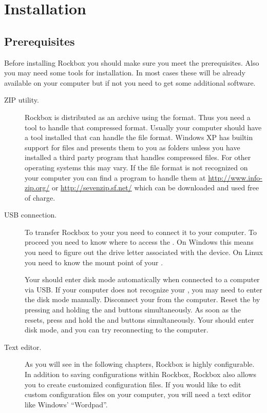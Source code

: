 \chapter{Installation}\label{sec:installation}

\section{Prerequisites}\label{sec:prerequisites}

Before installing Rockbox you should make sure you meet the prerequisites.
Also you may need some tools for installation. In most cases these will be
already available on your computer but if not you need to get some additional
software.

	\begin{description}
		
		\item[ZIP utility.]	  Rockbox is distributed as an archive using the 
		 format. Thus you need a tool to handle that compressed 
		format. Usually your computer should have a tool installed that can 
		handle the  file format. Windows XP has builtin support for 
		 files and presents them to you as folders unless you have 
		installed a third party program that handles compressed files.   For 
		other operating systems this may vary. If the  file format 
		is not recognized on your computer you can find a program to handle them 
		at \url{http://www.info-zip.org/} or \url{http://sevenzip.sf.net/} which 
		can be downloaded and used free of charge.

		\item[USB connection.]  To transfer Rockbox to your \dap{} you need to 
		connect it to your computer. To proceed you need to know where to access the 
		\dap{}. On Windows this means you need to figure out the drive letter 
		associated with the device. On Linux you need to know the mount point of 
		your \dap{}.

  	{
     \note
    	{
    	Your \dap{} should enter disk mode automatically when connected to a 
     	computer via USB.  If your computer does not recognize your \dap{}, you 
     	may need to enter the disk mode manually.  Disconnect your \dap{} 
     	from the computer.  Reset the \dap{} by pressing and holding the 
     	\ButtonMenu{} and \ButtonSelect{} buttons	simultaneously. As soon as the 
     	\dap{} resets, press and hold the	\ButtonMenu{} and \ButtonPlay{} buttons 
     	simultaneously.  Your \dap{} should enter disk mode, and you can try 
     	reconnecting to the computer.
    	}
    }

		\item[Text editor.]  As you will see in the following chapters, Rockbox is 
		highly configurable.  In addition to saving configurations within Rockbox, 
		Rockbox also allows you to create customized configuration files.  If you 
		would like to edit custom configuration files on your computer, you will 
		need a text editor like Windows' ``Wordpad''.

\end{description}


